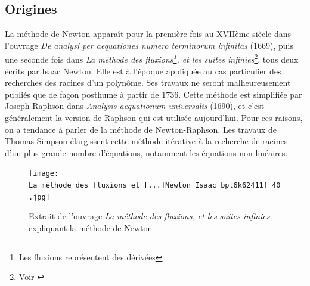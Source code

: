 \documentclass[3p, twocolumn]{elsarticle}
\begin{document}
\subsection{Origines}
La méthode de Newton apparaît pour la première fois au XVIIème siècle dans l'ouvrage \emph{De analysi per aequationes numero terminorum infinitas} (1669), puis une seconde fois dans \textit{La méthode des fluxions\footnote{Les fluxions représentent des dérivées}, et les suites infinies}\footnote{Voir \cite{book:newton_fluxions}}, tous deux écrits par Isaac Newton. Elle est à l'époque appliquée au cas particulier des recherches des racines d'un polynôme. Ses travaux ne seront malheureusement publiés que de façon posthume à partir de 1736. Cette méthode est simplifiée par Joseph Raphson dans \textit{Analysis aequationum universalis} (1690), et c'est généralement la version de Raphson qui est utilisée aujourd'hui. Pour ces raisons, on a tendance à parler de la méthode de Newton-Raphson. Les travaux de Thomas Simpson élargissent cette méthode itérative à la recherche de racines d'un plus grande nombre d'équations, notamment les équations non linéaires.
\begin{figure}[htbp]
    \centering
    \texttt{[image: La\_méthode\_des\_fluxions\_et\_[...]Newton\_Isaac\_bpt6k62411f\_40.jpg]}
    \caption{Extrait de l'ouvrage \textit{La méthode
            des fluxions, et les suites infinies} expliquant la méthode de Newton}
    \label{fig:fluxion_newton_method}
\end{figure}
\end{document}
